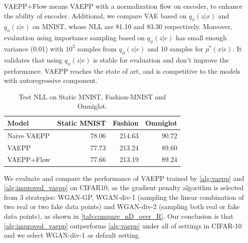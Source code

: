 \begin{table}[tb]
{%
VAEPP+Flow means VAEPP with a normalization flow on encoder, to enhance the ability of encoder. 
Additional, we compare VAE based on $q_\phi(z|x)$ and $q_\phi(z|e)$ on MNIST, whose NLL are 81.10 and 83.30 respectively. Moreover, evaluation using importance sampling based on $q_\phi(z|e)$ has small enough variance (0.01) with $10^3$ samples from $q_\phi(z|e)$ and 10 samples for $p^*(x|e)$. It validates that using $q_\phi(z|e)$ is stable for evaluation and don't improve the performance. VAEPP reaches the state of art, and is competitive to the models with autoregressive component. }
\label{tab:mnist-nll}
\end{table}
\begin{table}[tb]
\centering
\begin{tabular}{lrrr}  
\toprule
Model   & Static MNIST & Fashion & Omniglot \\
\midrule
Naive VAEPP    &   78.06   &  214.63  &   90.72 \\
VAEPP          &   77.73   &  213.24   &   89.60  \\
VAEPP+Flow     &   77.66   &  213.19  &   89.24  \\
\bottomrule
\end{tabular}
\caption{Test NLL on Static MNIST, Fashion-MNIST and Omniglot.  }
\label{tab:cifar-nll}
\end{table}
We evaluate and compare the performance of VAEPP trained by \cref{alg:vaepp} and \cref{alg:improved_vaepp} on CIFAR10, as the gradient penalty algorithm is selected from 3 strategies: WGAN-GP, WGAN-div-1  (sampling the linear combination of two real or two fake data points) and WGAN-div-2 (sampling both real or fake data points), as shown in \cref{tab:compare_nD_over_R}. Our conclusion is that \cref{alg:improved_vaepp} outperforms \cref{alg:vaepp} under all of settings in CIFAR-10 and we select WGAN-div-1 as default setting.
